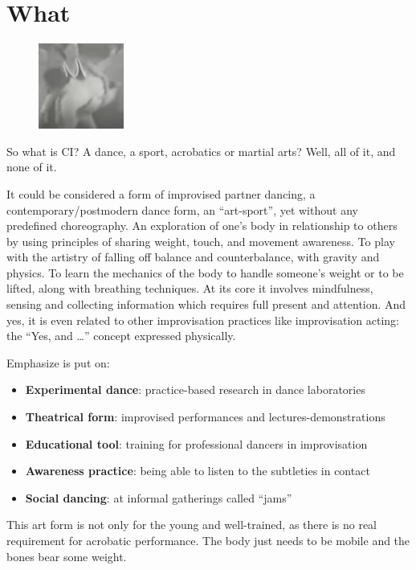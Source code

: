 \section{What}\label{sec:what}

\begin{figure}
\centering
\includegraphics[width=0.25\textwidth]{images/what}
\end{figure}

So what is CI? A dance, a sport, acrobatics or martial arts?
Well, all of it, and none of it.

It could be considered a form of improvised partner dancing, a contemporary/postmodern dance form, an ``art-sport'', yet without any predefined choreography.
An exploration of one's body in relationship to others by using principles of sharing weight, touch, and movement awareness.
To play with the artistry of falling off balance and counterbalance, with gravity and physics.
To learn the mechanics of the body to handle someone's weight or to be lifted, along with breathing techniques.
At its core it involves mindfulness, sensing and collecting information which requires full present and attention.
And yes, it is even related to other improvisation practices like improvisation acting: the ``Yes, and \ldots'' concept expressed physically.

Emphasize is put on:
\begin{itemize}
	\item \textbf{Experimental dance}: practice-based research in dance laboratories
	\item \textbf{Theatrical form}: improvised performances and lectures-demonstrations
	\item \textbf{Educational tool}: training for professional dancers in improvisation
	\item \textbf{Awareness practice}: being able to listen to the subtleties in contact
	\item \textbf{Social dancing}: at informal gatherings called ``jams''
\end{itemize}

This art form is not only for the young and well-trained, as there is no real requirement for acrobatic performance.
The body just needs to be mobile and the bones bear some weight.

